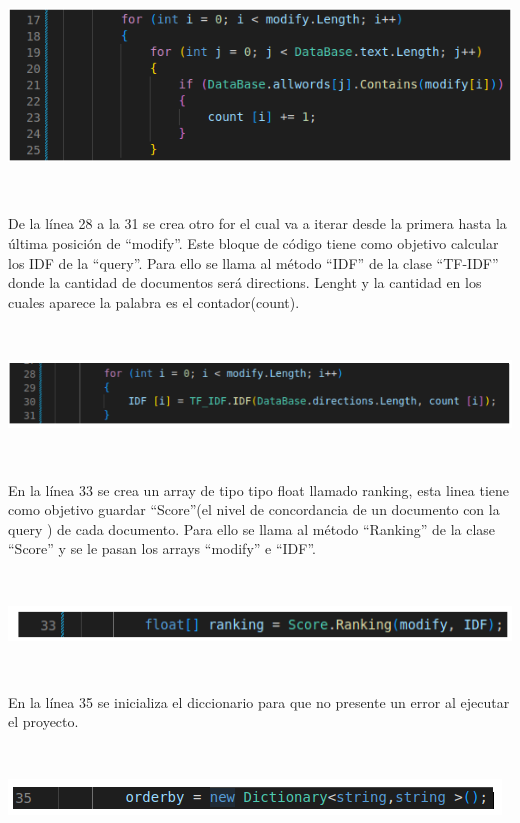 \documentclass{article}
\begin{document}
{\

\centering
\includegraphics[height = 3.7 cm ]{Captura desde 2023-07-19 11-34-05.png}

\

De la línea 28 a la 31 se crea otro for el cual va a iterar desde la primera hasta la última posición de “modify”. Este bloque de código tiene como objetivo calcular los IDF de la “query”.
Para ello se llama al método “IDF” de la clase “TF-IDF” donde la cantidad de documentos será directions. Lenght y la cantidad en los cuales aparece la palabra es el contador(count). 

\

\centering
\includegraphics[height = 1.6 cm ]{Captura desde 2023-07-19 11-37-30.png}

\

En la línea 33 se crea un array de tipo tipo float llamado ranking, esta linea tiene como objetivo guardar “Score”(el nivel de concordancia de un documento con la query ) de cada documento.
Para ello se llama al método “Ranking” de la clase “Score” y se le pasan los arrays “modify” e “IDF”.

\

\centering
\includegraphics[height = 0.8 cm ]{Captura desde 2023-07-19 11-41-47.png}

\

En la línea 35 se inicializa el diccionario para que no presente un error al ejecutar el proyecto.

\

\centering
\includegraphics[height = 0.8 cm ]{Captura desde 2023-07-19 11-48-50.png}

}
\end{document}
